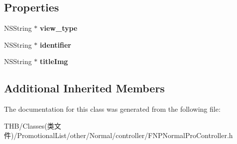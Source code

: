\subsection*{Properties}
\begin{DoxyCompactItemize}
\item 
\mbox{\label{interface_f_n_p_normal_pro_controller_a43905793fdc84a0e4009484f18d85d0f}} 
N\+S\+String $\ast$ {\bfseries view\+\_\+type}
\item 
\mbox{\label{interface_f_n_p_normal_pro_controller_a55a26b81c6aa7f095e2bd3f58fc5d6fd}} 
N\+S\+String $\ast$ {\bfseries identifier}
\item 
\mbox{\label{interface_f_n_p_normal_pro_controller_af45c26594b9fdc6c78a9c39f8ac44f18}} 
N\+S\+String $\ast$ {\bfseries title\+Img}
\end{DoxyCompactItemize}
\subsection*{Additional Inherited Members}


The documentation for this class was generated from the following file\+:\begin{DoxyCompactItemize}
\item 
T\+H\+B/\+Classes(类文件)/\+Promotional\+List/other/\+Normal/controller/F\+N\+P\+Normal\+Pro\+Controller.\+h\end{DoxyCompactItemize}

